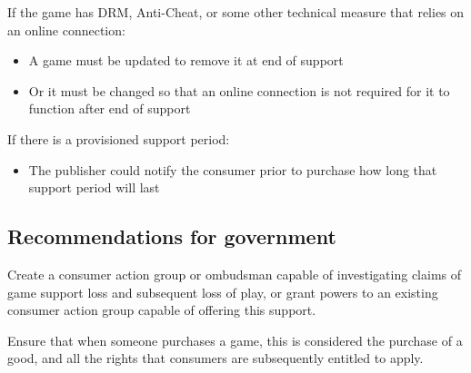 If the game has DRM, Anti-Cheat, or some other technical measure that relies on an online connection:
\begin{itemize}
    \item A game must be updated to remove it at end of support
    \item Or it must be changed so that an online connection is not required for it to function after end of support
\end{itemize}

If there is a provisioned support period:
\begin{itemize}
    \item The publisher could notify the consumer prior to purchase how long that support period will last
\end{itemize}


\subsection{Recommendations for government}

Create a consumer action group or ombudsman capable of investigating claims of game support loss and subsequent loss of play,
or grant powers to an existing consumer action group capable of offering this support.

Ensure that when someone purchases a game, this is considered the purchase of a good, and all the rights that consumers are subsequently entitled to apply.
